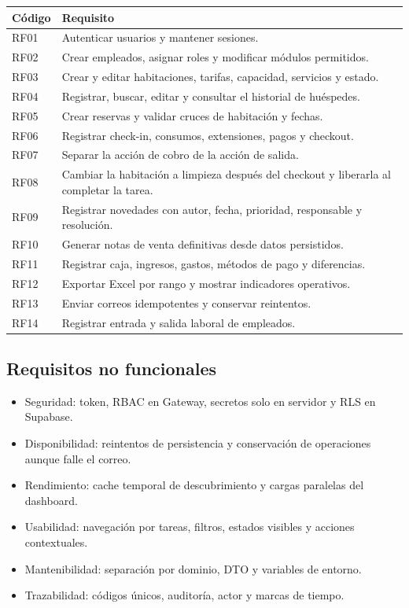 \documentclass[12pt,a4paper]{article}
\begin{document}
\begin{longtable}{p{1.5cm}p{12.5cm}}
\toprule
Código & Requisito \\
\midrule
RF01 & Autenticar usuarios y mantener sesiones. \\
RF02 & Crear empleados, asignar roles y modificar módulos permitidos. \\
RF03 & Crear y editar habitaciones, tarifas, capacidad, servicios y estado. \\
RF04 & Registrar, buscar, editar y consultar el historial de huéspedes. \\
RF05 & Crear reservas y validar cruces de habitación y fechas. \\
RF06 & Registrar check-in, consumos, extensiones, pagos y checkout. \\
RF07 & Separar la acción de cobro de la acción de salida. \\
RF08 & Cambiar la habitación a limpieza después del checkout y liberarla al completar la tarea. \\
RF09 & Registrar novedades con autor, fecha, prioridad, responsable y resolución. \\
RF10 & Generar notas de venta definitivas desde datos persistidos. \\
RF11 & Registrar caja, ingresos, gastos, métodos de pago y diferencias. \\
RF12 & Exportar Excel por rango y mostrar indicadores operativos. \\
RF13 & Enviar correos idempotentes y conservar reintentos. \\
RF14 & Registrar entrada y salida laboral de empleados. \\
\bottomrule
\end{longtable}

\subsection{Requisitos no funcionales}

\begin{itemize}
\item Seguridad: token, RBAC en Gateway, secretos solo en servidor y RLS en Supabase.
\item Disponibilidad: reintentos de persistencia y conservación de operaciones aunque falle el correo.
\item Rendimiento: cache temporal de descubrimiento y cargas paralelas del dashboard.
\item Usabilidad: navegación por tareas, filtros, estados visibles y acciones contextuales.
\item Mantenibilidad: separación por dominio, DTO y variables de entorno.
\item Trazabilidad: códigos únicos, auditoría, actor y marcas de tiempo.
\end{itemize}
\end{document}
